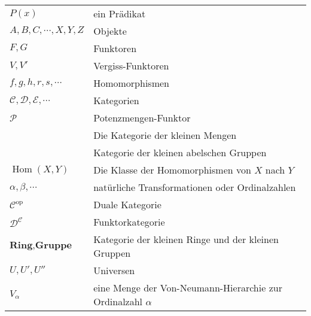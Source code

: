 \documentclass[a4paper]{amsart}
\theoremstyle{definition}
\DeclareMathOperator{\Hom}{Hom}
\newcommand{\CC}{\ensuremath{\mathcal{ C }}}
\newcommand{\DD}{\ensuremath{\mathcal{ D }}}
\newcommand{\PP}{\ensuremath{\mathcal{ P }}}
\newcommand{\Set}{\text{\textbf{Set}}}
\newcommand{\Ab}{\text{\textbf{Ab}}}
\begin{document}
\begin{tabular}{ll}
    $P(x)$                              & ein Prädikat\\
    $A, B, C, \cdots, X, Y, Z$          & Objekte\\
    $F,G$                               & Funktoren\\
    $V, V'$                             & Vergiss-Funktoren\\
    $f, g, h, r, s, \cdots$             & Homomorphismen\\
    $\mathcal C, \mathcal D, \mathcal E, \cdots$ & Kategorien\\
    $\PP$                               & Potenzmengen-Funktor\\
    \Set                                & Die Kategorie der kleinen Mengen\\
    \Ab                                 & Kategorie der kleinen abelschen Gruppen\\
    $\Hom( X, Y)$                       & Die Klasse der Homomorphismen von $X$ nach $Y$\\
    $\alpha, \beta, \cdots$             & natürliche Transformationen oder Ordinalzahlen\\
    $\mathcal C ^{\text{op}}$           & Duale Kategorie\\
    $\DD^\CC$                           & Funktorkategorie\\
    $\textbf{Ring}, \textbf{Gruppe}$    & Kategorie der kleinen Ringe und der kleinen Gruppen\\
    $U, U', U''$                        & Universen\\
    $V_\alpha$                          & eine Menge der Von-Neumann-Hierarchie zur Ordinalzahl
                                          $\alpha$

\end{tabular}
\end{document}
